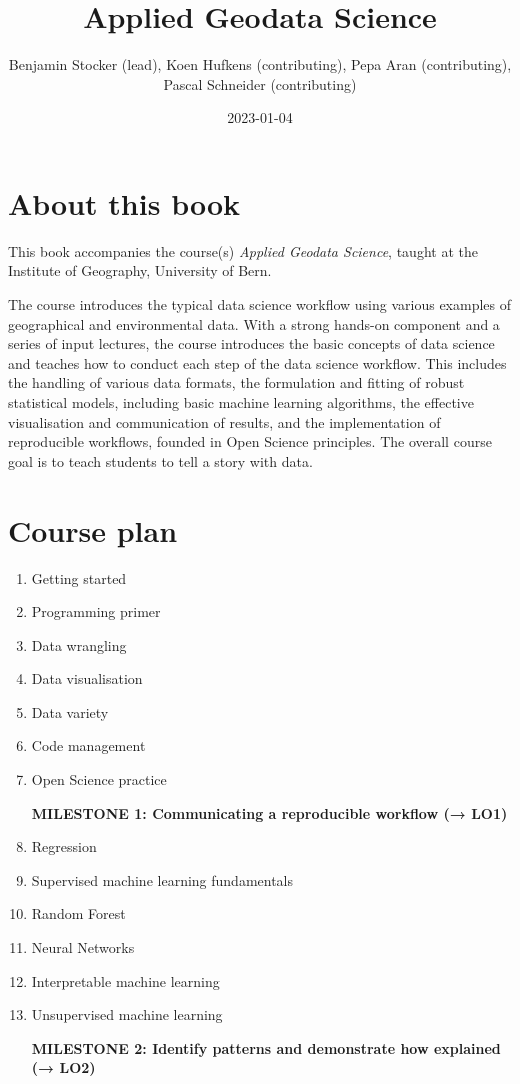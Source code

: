\documentclass[
]{book}
\title{Applied Geodata Science}
\author{Benjamin Stocker (lead), Koen Hufkens (contributing), Pepa Aran (contributing), Pascal Schneider (contributing)}
\date{2023-01-04}
\begin{document}
\maketitle

{
\setcounter{tocdepth}{1}
\tableofcontents
}
\hypertarget{about-this-book}{%
\chapter*{About this book}\label{about-this-book}}

This book accompanies the course(s) \emph{Applied Geodata Science}, taught at the Institute of Geography, University of Bern.

The course introduces the typical data science workflow using various examples of geographical and environmental data. With a strong hands-on component and a series of input lectures, the course introduces the basic concepts of data science and teaches how to conduct each step of the data science workflow. This includes the handling of various data formats, the formulation and fitting of robust statistical models, including basic machine learning algorithms, the effective visualisation and communication of results, and the implementation of reproducible workflows, founded in Open Science principles. The overall course goal is to teach students to tell a story with data.

\hypertarget{course-plan}{%
\chapter*{Course plan}\label{course-plan}}

\begin{enumerate}
\def\labelenumi{\arabic{enumi}.}
\item
  Getting started
\item
  Programming primer
\item
  Data wrangling
\item
  Data visualisation
\item
  Data variety
\item
  Code management
\item
  Open Science practice

  \textbf{MILESTONE 1: Communicating a reproducible workflow (→ LO1)}
\item
  Regression
\item
  Supervised machine learning fundamentals
\item
  Random Forest
\item
  Neural Networks
\item
  Interpretable machine learning
\item
  Unsupervised machine learning

  \textbf{MILESTONE 2: Identify patterns and demonstrate how explained (→ LO2)}
\end{enumerate}
\end{document}
